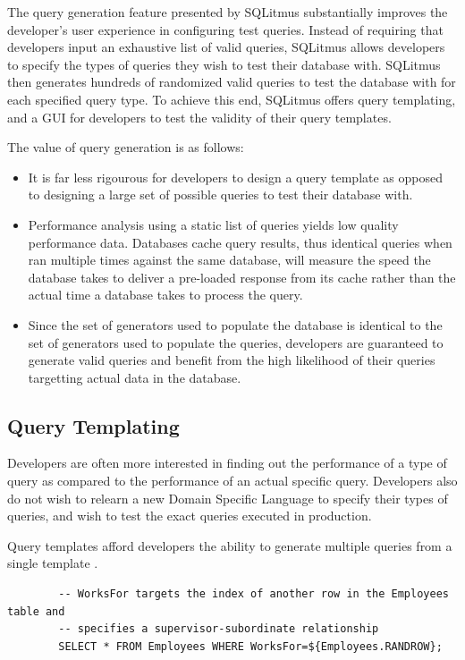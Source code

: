 \documentclass[12pt]{report}
\begin{document}
\begin{spacing}{1.9}
		The query generation feature presented by SQLitmus substantially improves the developer's user experience in configuring test queries. Instead of requiring that developers input an exhaustive list of valid queries, SQLitmus allows developers to specify the types of queries they wish to test their database with. SQLitmus then generates hundreds of randomized valid queries to test the database with for each specified query type. To achieve this end, SQLitmus offers query templating, and a GUI for developers to test the validity of their query templates.
		
		The value of query generation is as follows:
		\begin{itemize}
			\item It is far less rigourous for developers to design a query template as opposed to designing a large set of possible queries to test their database with.
			\item Performance analysis using a static list of queries yields low quality performance data. Databases cache query results, thus identical queries when ran multiple times against the same database, will measure the speed the database takes to deliver a pre-loaded response from its cache rather than the actual time a database takes to process the query.
			\item Since the set of generators used to populate the database is identical to the set of generators used to populate the queries, developers are guaranteed to generate valid queries and benefit from the high likelihood of their queries targetting actual data in the database.
		\end{itemize}
		
		\subsection{Query Templating}
		
		Developers are often more interested in finding out the performance of a type of query as compared to the performance of an actual specific query. Developers also do not wish to relearn a new Domain Specific Language to specify their types of queries, and wish to test the exact queries executed in production.
		
		Query templates afford developers the ability to generate multiple queries from a single template . 
		
		
		
		\begin{verbatim}
		-- WorksFor targets the index of another row in the Employees table and
		-- specifies a supervisor-subordinate relationship
		SELECT * FROM Employees WHERE WorksFor=${Employees.RANDROW};
		\end{verbatim}
		

\end{spacing}
\end{document}
